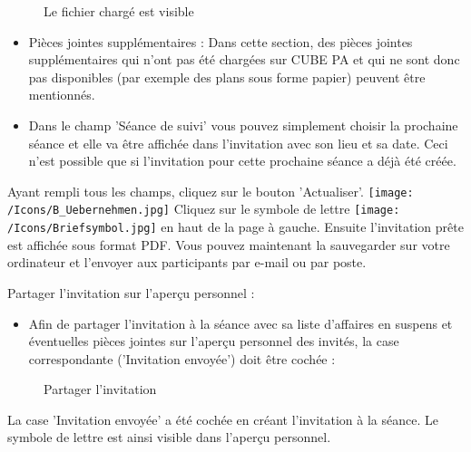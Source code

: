 \begin{figure}[H]
\caption{Le fichier chargé est visible}
\end{figure}

\begin{itemize}
\item 
Pièces jointes supplémentaires  : Dans cette section, des pièces jointes supplémentaires qui n'ont pas été chargées sur CUBE PA et qui ne sont donc pas disponibles (par exemple des plans sous forme papier) peuvent être mentionnés.
\item 
Dans le champ 'Séance de suivi' vous pouvez simplement choisir la prochaine séance et elle va être affichée dans l'invitation avec son lieu et sa date. Ceci n'est possible que si l'invitation pour cette prochaine séance a déjà été créée.
\end{itemize}

Ayant rempli tous les champs, cliquez sur le bouton 'Actualiser'. \texttt{[image: /Icons/B\_Uebernehmen.jpg]} \newline
Cliquez sur le symbole de lettre \texttt{[image: /Icons/Briefsymbol.jpg]} en haut de la page à gauche. Ensuite l'invitation prête est affichée sous format PDF. Vous pouvez maintenant la sauvegarder sur votre ordinateur et l'envoyer aux participants par e-mail ou par poste.

\vspace{\baselineskip}

Partager l'invitation sur l'aperçu personnel :

\begin{itemize}
\item
Afin de partager l'invitation à la séance avec sa liste d'affaires en suspens et éventuelles pièces jointes sur l'aperçu personnel des invités, la case correspondante ('Invitation envoyée') doit être cochée :
\end{itemize}

\begin{figure}[H]
\caption{Partager l'invitation}
\end{figure}

\begin{small}
La case 'Invitation envoyée' a été cochée en créant l'invitation à la séance. Le symbole de lettre est ainsi visible dans l'aperçu personnel.
\end{small}

